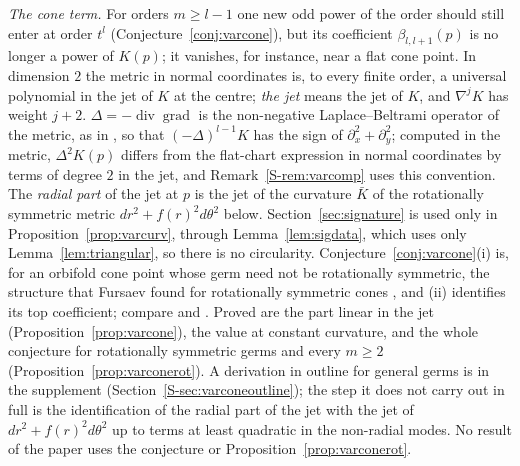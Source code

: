\documentclass[pdflatex,sn-mathphys-num]{sn-jnl}
\theoremstyle{thmstyleone}%
\theoremstyle{thmstylethree}%
\newcommand{\sref}[1]{\ref*{S-#1}}%
\begin{document}
\emph{The cone term.} For orders $m\ge l-1$ one new odd power of the order should still enter at order $t^l$ (Conjecture~\ref{conj:varcone}), but its coefficient $\beta_{l,l+1}(p)$ is no longer a power of $K(p)$; it vanishes, for instance, near a flat cone point. In dimension $2$ the metric in normal coordinates is, to every finite order, a universal polynomial in the jet of $K$ at the centre; \emph{the jet} means the jet of $K$, and $\nabla^jK$ has weight $j+2$. $\Delta=-\operatorname{div}\operatorname{grad}$ is the non-negative Laplace--Beltrami operator of the metric, as in \cite[\S1]{schueth2019}, so that $(-\Delta)^{l-1}K$ has the sign of $\partial_x^2+\partial_y^2$; computed in the metric, $\Delta^2K(p)$ differs from the flat-chart expression in normal coordinates by terms of degree $2$ in the jet, and Remark~\sref{rem:varcomp} uses this convention. The \emph{radial part} of the jet at $p$ is the jet of the curvature $\bar K$ of the rotationally symmetric metric $dr^2+f(r)^2d\theta^2$ below. Section~\ref{sec:signature} is used only in Proposition~\ref{prop:varcurv}, through Lemma~\ref{lem:sigdata}, which uses only Lemma~\ref{lem:triangular}, so there is no circularity. Conjecture~\ref{conj:varcone}(i) is, for an orbifold cone point whose germ need not be rotationally symmetric, the structure that Fursaev found for rotationally symmetric cones \cite{fursaev1994}, and (ii) identifies its top coefficient; compare \cite{suleymanova2017} and \cite[Thm~4.1]{schueth2019}. Proved are the part linear in the jet (Proposition~\ref{prop:varcone}), the value at constant curvature, and the whole conjecture for rotationally symmetric germs and every $m\ge2$ (Proposition~\ref{prop:varconerot}). A derivation in outline for general germs is in the supplement (Section~\sref{sec:varconeoutline}); the step it does not carry out in full is the identification of the radial part of the jet with the jet of $dr^2+f(r)^2d\theta^2$ up to terms at least quadratic in the non-radial modes. No result of the paper uses the conjecture or Proposition~\ref{prop:varconerot}.
\end{document}
